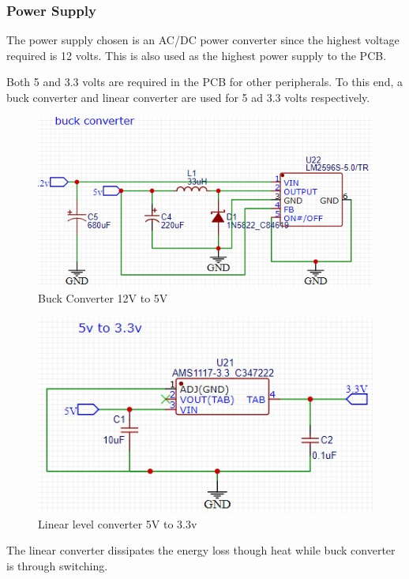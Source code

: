 \subsubsection{Power Supply}
The power supply chosen is an AC/DC power converter since the highest voltage required is 12 volts. This is also used as the highest power supply to the PCB.

Both 5 and 3.3 volts are required in the PCB for other peripherals. To this end, a buck converter and linear converter are used for 5 ad 3.3 volts respectively.

\begin{center}
	\begin{figure}[H]
	\centering
	\includegraphics{Figures/buck}
	\caption[Buck converter]{Buck Converter 12V to 5V}
	\end{figure}
\end{center}

\begin{center}
	\begin{figure}[H]
	\centering
	\includegraphics{Figures/5233}
	\caption[Linear Voltage Converter]{Linear level converter 5V to 3.3v}
	\end{figure}
\end{center}
The linear converter dissipates the energy loss though heat while buck converter is through switching.

